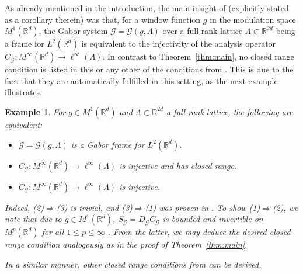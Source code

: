 \documentclass{amsart}
\newtheorem{example}[theorem]{Example}
\def\Hil{\mathcal{H}}
\newcommand{\R}[0]{{\mathbb{R}}}
\newcommand{\G}[0]{{\mathcal{G}}}
\begin{document}
As already mentioned in the introduction, the main insight of \cite{gro07ineq} (explicitly stated as a corollary therein) was that, for a window function $g$ in the modulation space $M^1(\R^d)$, the Gabor system $\mathcal{G}=\G(g,\Lambda)$ over a full-rank lattice $\Lambda \subset \mathbb{R}^{2d}$ being a frame for $L^2(\mathbb{R}^d)$ is equivalent to the injectivity of the analysis operator $C_{\G}:M^\infty(\R^d) \to \ell^{\infty}(\Lambda)$. In contrast to Theorem~\ref{thm:main}, no closed range condition is listed in this or any other of the conditions from \cite[Theorem~3.1]{gro07ineq}. This is due to the fact that they are automatically fulfilled in this setting, as the next example illustrates. 

\begin{example}\label{ex:gabor}
For $g\in M^1(\mathbb{R}^d)$ and $\Lambda \subset \mathbb{R}^{2d}$ a full-rank lattice, the following are equivalent:
\begin{itemize}
    \item[(1)] $\G =\G(g,\Lambda)$ is a Gabor frame for $L^2(\mathbb{R}^d)$.
    \item[(2)] $C_{\G}:M^\infty(\R^d) \to \ell^{\infty}(\Lambda)$ is injective and has closed range.
    \item[(3)] $C_{\G}:M^\infty(\R^d) \to \ell^{\infty}(\Lambda)$ is injective.
\end{itemize}
Indeed, (2)$\Rightarrow$(3) is trivial, and (3)$\Rightarrow$(1) was proven in \cite{gro07ineq}. To show (1)$\Rightarrow$(2), we note that due to $g\in M^1(\mathbb{R}^d)$, %
$S_{\G} = D_{\G}C_{\G}$ is bounded and invertible on $M^p(\mathbb{R}^d)$ for all $1\leq p\leq \infty$ \cite[Theorem~3.1]{gro07ineq}. From the latter, we may deduce the desired closed range condition analogously as in the proof of Theorem~\ref{thm:main}.

In a similar manner, other closed range conditions from \cite[Theorem~3.1]{gro07ineq} can be derived.
\end{example}
\end{document}
